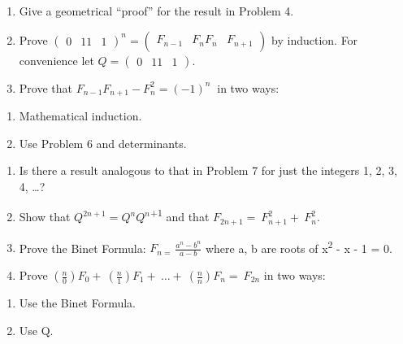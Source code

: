 \documentclass[10pt,letter]{article}
\begin{document}
\begin{enumerate}
\def\labelenumi{\arabic{enumi}.}

\item
  Give a geometrical ``proof'' for the result in Problem 4.
\item
  Prove \(\begin{pmatrix}
  0 & 1
  1 & 1
  \end{pmatrix}^{n} = \begin{pmatrix}
  F_{n - 1} & F_{n}
  F_{n} & F_{n + 1}
  \end{pmatrix}\) by induction. For convenience let \(Q =\begin{pmatrix}
  0 & 1
  1 & 1
  \end{pmatrix}
\).
\item
  Prove that \(F_{n - 1}F_{n + 1} - F_{n}^{2} = {( - 1)}^{n}\ \) in two
  ways:

\end{enumerate}
\begin{enumerate}
\def\labelenumi{(\alph{enumi})}

\item
  Mathematical induction.
\item
  Use Problem 6 and determinants.

\end{enumerate}
\begin{enumerate}
\def\labelenumi{\arabic{enumi}.}

\item
  Is there a result analogous to that in Problem 7 for just the integers
  1, 2, 3, 4, \ldots{}?
\item
  Show that \(Q^{2n + 1} = Q^{n}Q^{n}\)\textsuperscript{+1} and that
  \(F_{2n + 1} = \ F_{n + 1}^{2} + \ F_{n}^{2}\).
\item
  Prove the Binet Formula: \(F_{n = \ }\frac{a^{n} - b^{n}}{a - b}\)
  where a, b are roots of x\textsuperscript{2} - x - 1 = 0.
\item
  Prove
  \(\left( \frac{n}{0} \right)F_{0} + \ \left( \frac{n}{1} \right)F_{1} + \ \ldots + \ \left( \frac{n}{n} \right)F_{n} = \ F_{2n}\)
  in two ways:

\end{enumerate}
\begin{enumerate}
\def\labelenumi{(\alph{enumi})}

\item
  Use the Binet Formula.
\item
  Use Q.

\end{enumerate}
\end{document}
